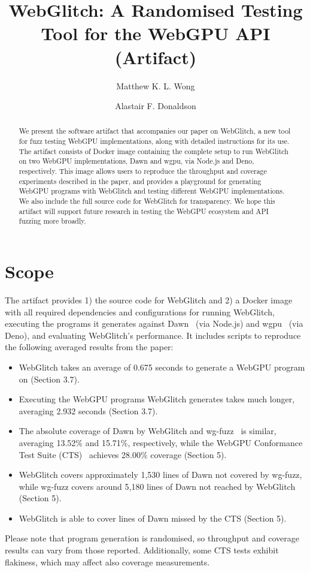 \documentclass[a4paper,UKenglish]{darts-v2021}
\title{WebGlitch: A Randomised Testing Tool for the WebGPU API (Artifact)} %
\author{Matthew K. L. Wong}{Department of Computing, Imperial College London, United Kingdom}{kwok.wong19@imperial.ac.uk}{https://orcid.org/0009-0004-2776-5430}{}
\author{Alastair F. Donaldson}{Department of Computing, Imperial College London, United Kingdom}{alastair.donaldson@imperial.ac.uk}{https://orcid.org/0000-0002-7448-7961}{}
\newenvironment{scope}{\section{Scope}}{}
\begin{document}
\maketitle

\begin{abstract}
We present the software artifact that accompanies our paper on WebGlitch, a new tool for fuzz testing WebGPU implementations, along with detailed instructions for its use.
The artifact consists of Docker image containing the complete setup to run WebGlitch on two WebGPU implementations, Dawn and wgpu, via Node.js and Deno, respectively.
This image allows users to reproduce the throughput and coverage experiments described in the paper, and provides a playground for generating WebGPU programs with WebGlitch and testing different WebGPU implementations. 
We also include the full source code for WebGlitch for transparency.
We hope this artifact will support future research in testing the WebGPU ecosystem and API fuzzing more broadly.
 \end{abstract}


\begin{scope}
The artifact provides 1) the source code for WebGlitch and 2) a Docker image with all required dependencies and configurations for running WebGlitch, executing the programs it generates against Dawn~\cite{dawn} (via Node.js) and wgpu~\cite{wgpu} (via Deno), and evaluating WebGlitch's performance. 
It includes scripts to reproduce the following averaged results from the paper: 
\begin{itemize}
    \item WebGlitch takes an average of 0.675 seconds to generate a WebGPU program on (Section 3.7). 
    \item Executing the WebGPU programs WebGlitch generates takes much longer, averaging 2.932 seconds (Section 3.7).
    \item The absolute coverage of Dawn by WebGlitch and wg-fuzz~\cite{wgfuzz} is similar, averaging 13.52\% and 15.71\%, respectively, while the WebGPU Conformance Test Suite (CTS)~\cite{cts} achieves 28.00\% coverage (Section 5). 
    \item WebGlitch covers approximately 1,530 lines of Dawn not covered by wg-fuzz, while wg-fuzz covers around 5,180 lines of Dawn not reached by WebGlitch (Section 5). 
    \item WebGlitch is able to cover lines of Dawn missed by the CTS (Section 5).
\end{itemize}
Please note that program generation is randomised, so throughput and coverage results can vary from those reported.
Additionally, some CTS tests exhibit flakiness, which may affect also coverage measurements.
\end{scope}
\end{document}
